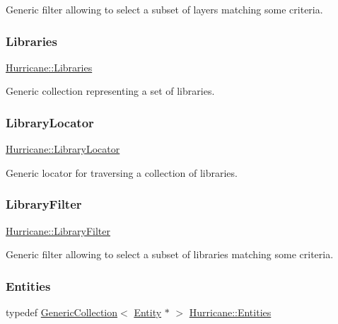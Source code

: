 Generic filter allowing to select a subset of layers matching some criteria. \mbox{\label{namespaceHurricane_a2868a53bbb0507710460ff02fab77cad}} 
\subsubsection{\texorpdfstring{Libraries}{Libraries}}
{\footnotesize\ttfamily \hyperlink{namespaceHurricane_a2868a53bbb0507710460ff02fab77cad}{Hurricane\+::\+Libraries}}

Generic collection representing a set of libraries. \mbox{\label{namespaceHurricane_a0477ab8ee799bb25ce9521ac16dbb6b9}} 
\subsubsection{\texorpdfstring{Library\+Locator}{LibraryLocator}}
{\footnotesize\ttfamily \hyperlink{namespaceHurricane_a0477ab8ee799bb25ce9521ac16dbb6b9}{Hurricane\+::\+Library\+Locator}}

Generic locator for traversing a collection of libraries. \mbox{\label{namespaceHurricane_a72d63f6bfd54feac2663e60430fd443d}} 
\subsubsection{\texorpdfstring{Library\+Filter}{LibraryFilter}}
{\footnotesize\ttfamily \hyperlink{namespaceHurricane_a72d63f6bfd54feac2663e60430fd443d}{Hurricane\+::\+Library\+Filter}}

Generic filter allowing to select a subset of libraries matching some criteria. \mbox{\label{namespaceHurricane_af50ef2888fd2a5b58b0de14cdfaabc56}} 
\subsubsection{\texorpdfstring{Entities}{Entities}}
{\footnotesize\ttfamily typedef \hyperlink{classHurricane_1_1GenericCollection}{Generic\+Collection}$<$ \hyperlink{classHurricane_1_1Entity}{Entity} $\ast$ $>$ \hyperlink{namespaceHurricane_af50ef2888fd2a5b58b0de14cdfaabc56}{Hurricane\+::\+Entities}}

